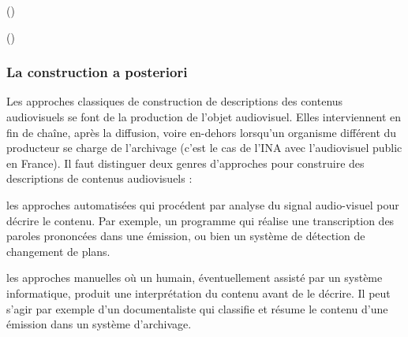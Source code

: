  (\cite[p.23, Metadata in the Workflow]{Austerberry2004})

 (\cite{Rayers2002})




\subsubsection{La construction a posteriori}
Les approches classiques de construction de descriptions des contenus audiovisuels se font  de la production de l'objet audiovisuel. 
Elles interviennent en fin de chaîne, après la diffusion, voire en-dehors lorsqu'un organisme différent du producteur se charge de l'archivage (c'est le cas de l'INA avec l'audiovisuel public en France). 
Il faut distinguer deux genres d'approches pour construire des descriptions de contenus audiovisuels : 
\begin{liste}
	\item les approches automatisées qui procédent par analyse du signal audio-visuel pour décrire le contenu.
	Par exemple, un programme qui réalise une transcription des paroles prononcées dans une émission, ou bien un système de détection de changement de plans. 

	\item les approches manuelles où un humain, éventuellement assisté par un système informatique, produit une interprétation du contenu avant de le décrire. 
	Il peut s'agir par exemple d'un documentaliste qui classifie et résume le contenu d'une émission dans un système d'archivage.
\end{liste}

